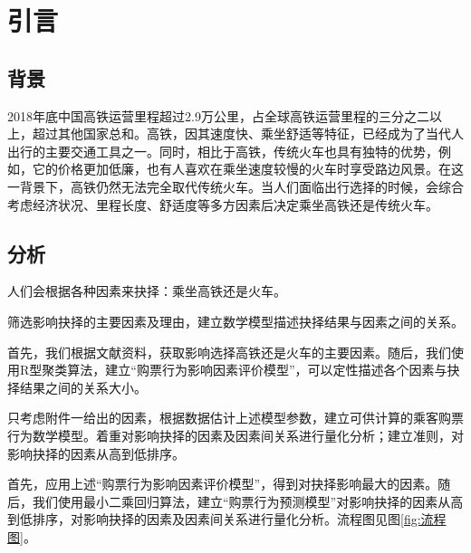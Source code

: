 \documentclass{ctexart}
\newcounter{sub}
\begin{document}
\newpage

\setcounter{section}{-1}


\section{引言}%
\label{sec:引言}

\subsection{背景}%
\label{sub:背景}
2018年底中国高铁运营里程超过2.9万公里，占全球高铁运营里程的三分之二以上，超过其他国家总和。高铁，因其速度快、乘坐舒适等特征，已经成为了当代人出行的主要交通工具之一。同时，相比于高铁，传统火车也具有独特的优势，例如，它的价格更加低廉，也有人喜欢在乘坐速度较慢的火车时享受路边风景。在这一背景下，高铁仍然无法完全取代传统火车。当人们面临出行选择的时候，会综合考虑经济状况、里程长度、舒适度等多方因素后决定乘坐高铁还是传统火车。\cite{巩慧琴2012高铁时代下旅客交通工具选择行为研究}

\subsection{分析}%
\label{sub:分析}

人们会根据各种因素来抉择：乘坐高铁还是火车。

\begin{Exercise}
	筛选影响抉择的主要因素及理由，建立数学模型描述抉择结果与因素之间的关系。
\end{Exercise}

\begin{Answer}
	首先，我们根据文献资料，获取影响选择高铁还是火车的主要因素。随后，我们使用R型聚类算法，建立\enquote{购票行为影响因素评价模型}，可以定性描述各个因素与抉择结果之间的关系大小。
\end{Answer}

\begin{Exercise}
	只考虑附件一给出的因素，根据数据估计上述模型参数，建立可供计算的乘客购票行为数学模型。着重对影响抉择的因素及因素间关系进行量化分析；建立准则，对影响抉择的因素从高到低排序。
\end{Exercise}

\begin{Answer}
	首先，应用上述\enquote{购票行为影响因素评价模型}，得到对抉择影响最大的因素。随后，我们使用最小二乘回归算法，建立\enquote{购票行为预测模型}对影响抉择的因素从高到低排序，对影响抉择的因素及因素间关系进行量化分析。流程图见图\ref{fig:流程图}。
\end{Answer}
\end{document}
